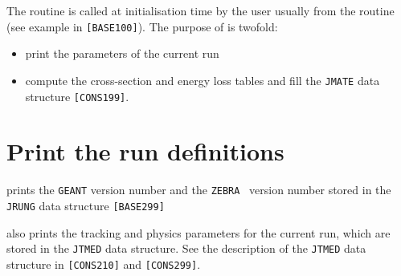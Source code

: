  
 
The routine  is called at initialisation time by the user
usually from the  routine (see example in {\tt [BASE100]}). 
The purpose of  is twofold:
\begin{itemize}
\item print the parameters of the current run
\item compute the cross-section and energy loss tables and fill the
{\tt JMATE} data structure {\tt [CONS199]}.
\end{itemize}
\section {Print the run definitions }
 
 prints the {\tt GEANT} version number and the 
{\tt ZEBRA}~\cite{bib-ZEBRA} version number stored
in the {\tt JRUNG} data structure {\tt [BASE299]} 
 
 also prints the tracking and physics
parameters for the current run, which are stored in
the {\tt JTMED} data structure.
See the description of the {\tt JTMED} 
data structure in {\tt [CONS210]} and {\tt [CONS299]}.
 
